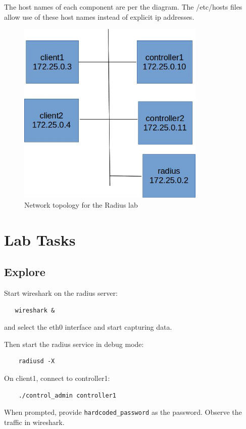 The host names of each component are per the diagram.  The /etc/hosts files
allow use of these host names instead of explicit ip addresses.

\begin{figure}[htb]
\begin{center}
\includegraphics [width=0.8\textwidth,natwidth=621,natheight=403]{radius.jpg}
\end{center}
\caption{Network topology for the Radius lab}
\label{fig:topology}
\end{figure}

\section{Lab Tasks}
\subsection{Explore}
Start wireshark on the radius server:
\begin{verbatim}
   wireshark &
\end{verbatim}
\noindent and select the eth0 interface and start capturing data.

Then start the radius service in debug mode:
\begin{verbatim}
    radiusd -X
\end{verbatim}

On client1, connect to controller1:
\begin{verbatim}
    ./control_admin controller1
\end{verbatim}
\noindent When prompted, provide {\tt hardcoded\_password} as the password.
Observe the traffic in wireshark.

